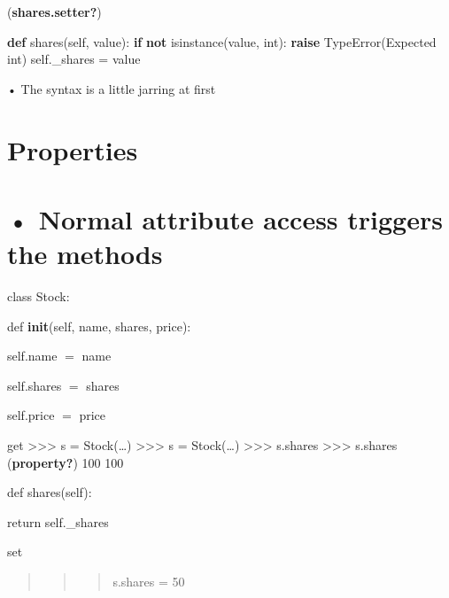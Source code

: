 \documentclass[
  letterpaper,
  DIV=11,
  numbers=noendperiod]{scrreprt}
\newenvironment{Shaded}{\begin{snugshade}}{\end{snugshade}}
\newcommand{\BuiltInTok}[1]{\textcolor[rgb]{0.00,0.23,0.31}{#1}}
\newcommand{\ControlFlowTok}[1]{\textcolor[rgb]{0.00,0.23,0.31}{\textbf{#1}}}
\newcommand{\KeywordTok}[1]{\textcolor[rgb]{0.00,0.23,0.31}{\textbf{#1}}}
\newcommand{\NormalTok}[1]{\textcolor[rgb]{0.00,0.23,0.31}{#1}}
\newcommand{\OperatorTok}[1]{\textcolor[rgb]{0.37,0.37,0.37}{#1}}
\newcommand{\PreprocessorTok}[1]{\textcolor[rgb]{0.68,0.00,0.00}{#1}}
\newcommand{\StringTok}[1]{\textcolor[rgb]{0.13,0.47,0.30}{#1}}
\newcommand{\VariableTok}[1]{\textcolor[rgb]{0.07,0.07,0.07}{#1}}
\begin{document}
(\textbf{shares.setter?})

\begin{Shaded}
\begin{Highlighting}[]
\KeywordTok{def}\NormalTok{ shares(}\VariableTok{self}\NormalTok{, value): }\ControlFlowTok{if} \KeywordTok{not} \BuiltInTok{isinstance}\NormalTok{(value, }\BuiltInTok{int}\NormalTok{): }\ControlFlowTok{raise} \PreprocessorTok{TypeError}\NormalTok{(}\StringTok{\textquotesingle{}Expected int\textquotesingle{}}\NormalTok{) }\VariableTok{self}\NormalTok{.\_shares }\OperatorTok{=}\NormalTok{ value }
\end{Highlighting}
\end{Shaded}

• The syntax is a little jarring at first


\chapter{Properties}\label{properties-1}


\chapter{• Normal attribute access triggers the
methods}\label{normal-attribute-access-triggers-the-methods}

class Stock:

def \textbf{init}(self, name, shares, price):

self.name \(=\) name

self.shares \(=\) shares

self.price \(=\) price

get \textgreater\textgreater\textgreater{} s = Stock(\ldots)
\textgreater\textgreater\textgreater{} s = Stock(\ldots)
\textgreater\textgreater\textgreater{} s.shares
\textgreater\textgreater\textgreater{} s.shares (\textbf{property?}) 100
100

def shares(self):

return self.\_shares

set

\begin{quote}
\begin{quote}
\begin{quote}
s.shares = 50
\end{quote}
\end{quote}
\end{quote}
\end{document}
